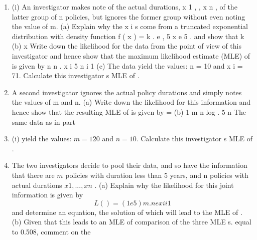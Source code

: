 \documentclass[a4paper,12pt]{article}
\begin{document}

\begin{enumerate}


12
A certain type of insurance policy has a claim rate of per year and the cover ceases and the policy expires after the first claim. Accordingly the duration of a policy is modelled by an exponential distribution with density function e x : 0 x
.
A company has data on (m + n) policies which have expired and which may beassumed to be independent. Of these, m policies had duration less than 5 years and n policies had duration greater than or equal to 5 years.
\item (i)
An investigator makes note of the actual durations, x 1 , , x n , of the latter group of n policies, but ignores the former group without even noting the value of m.
(a)
Explain why the x i s come from a truncated exponential distribution
with density function
f ( x ) = k . e
, 5
x
e 5 .
and show that k
(b)
x
Write down the likelihood for the data from the point of view of this investigator and hence show that the maximum likelihood estimate
(MLE) of is given by
n
n
.
x i 5 n
i 1
(c)
The data yield the values: n = 10 and x i = 71. Calculate this investigator s MLE of .

\item %
A second investigator ignores the actual policy durations and simply notes the values of m and n.
(a)
Write down the likelihood for this information and hence show that the resulting MLE of is given by
=
(b)
1
m n
log
.
5
n
The same data as in part \item (i) yield the values: $m = 120$ and $n = 10$.
Calculate this investigator s MLE of .
\item %
The two investigators decide to pool their data, and so have the information that there are $m$ policies with duration less than 5 years, and n policies with actual durations $x 1 , ... , x n$ .
(a)
Explain why the likelihood for this joint information is given by
\[L ( ) = (1 e
5
) m .
n
e
x i
i 1\]
and determine an equation, the solution of which will lead to the MLE
of .
(b)
Given that this leads to an MLE of comparison of the three MLE s.
equal to 0.508, comment on the

\newpage


\end{enumerate}
\end{document}
